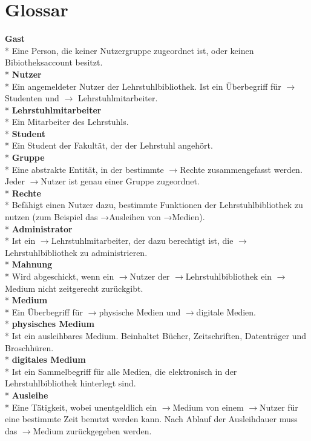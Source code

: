 \documentclass[12pt, a4paper]{article}
\begin{document}
\section{Glossar}
\textbf{Gast}
\\*
Eine Person, die keiner Nutzergruppe zugeordnet ist, oder keinen Bibiotheksaccount besitzt.
\\*
\textbf{Nutzer}
\\*
Ein angemeldeter Nutzer der Lehrstuhlbibliothek. Ist ein Überbegriff für $\rightarrow$ Studenten  und $\rightarrow$ Lehrstuhlmitarbeiter.
\\*
\textbf{Lehrstuhlmitarbeiter}
\\*
Ein Mitarbeiter des Lehrstuhls.
\\*
\textbf{Student}
\\*
Ein Student der Fakultät, der der Lehrstuhl angehört.
\\*
\textbf{Gruppe}
\\*
Eine abstrakte Entität, in der bestimmte $\rightarrow$Rechte zusammengefasst werden. Jeder $\rightarrow$Nutzer ist genau einer Gruppe zugeordnet.
\\*
\textbf{Rechte}
\\*
Befähigt einen Nutzer dazu, bestimmte Funktionen der Lehrstuhlbibliothek zu nutzen (zum Beispiel das →Ausleihen von →Medien).
\\*
\textbf{Administrator}
\\*
Ist ein $\rightarrow$Lehrstuhlmitarbeiter, der dazu berechtigt ist, die $\rightarrow$Lehrstuhlbibliothek zu administrieren.
\\*
\textbf{Mahnung}
\\*
Wird abgeschickt, wenn ein $\rightarrow$Nutzer der $\rightarrow$Lehrstuhlbibliothek ein $\rightarrow$Medium nicht zeitgerecht zurückgibt.
\\*
\textbf{Medium}
\\*
Ein Überbegriff für $\rightarrow$physische Medien und $\rightarrow$digitale Medien.
\\*
\textbf{physisches Medium}
\\*
Ist ein ausleihbares Medium. Beinhaltet Bücher, Zeitschriften, Datenträger und Broschhüren.
\\*
\textbf{digitales Medium}
\\*
Ist ein Sammelbegriff für alle Medien, die elektronisch in der Lehrstuhlbibliothek hinterlegt sind.
\\*
\textbf{Ausleihe}
\\*
Eine Tätigkeit, wobei unentgeldlich ein $\rightarrow$Medium von einem $\rightarrow$Nutzer für eine bestimmte Zeit benutzt werden kann. Nach Ablauf der Ausleihdauer muss das $\rightarrow$Medium zurückgegeben werden.
\end{document}
